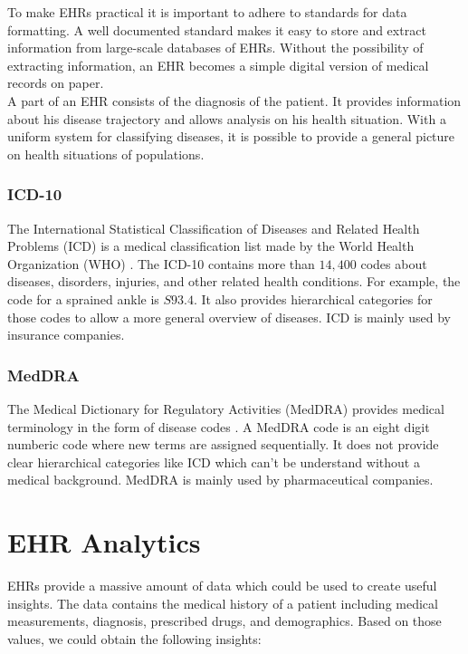 To make EHRs practical it is important to adhere to standards for data formatting. A well documented standard makes it easy to store and extract information from large-scale databases of EHRs. Without the possibility of extracting information, an EHR becomes a simple digital version of medical records on paper. \\
A part of an EHR consists of the diagnosis of the patient. It provides information about his disease trajectory and allows analysis on his health situation. With a uniform system for classifying diseases, it is possible to provide a general picture on health situations of populations.

\subsubsection{ICD-10}

The International Statistical Classification of Diseases and Related Health Problems (ICD) is a medical classification list made by the World Health Organization (WHO) \cite{WHO_ICD:online}. The ICD-10 contains more than $14,400$ codes about diseases, disorders, injuries, and other related health conditions. For example, the code for a sprained ankle is $S93.4$. It also provides hierarchical categories for those codes to allow a more general overview of diseases. ICD is mainly used by insurance companies.


\subsubsection{MedDRA}

The Medical Dictionary for Regulatory Activities (MedDRA) provides medical terminology in the form of disease codes \cite{MedDRA:online}. A MedDRA code is an eight digit numberic code where new terms are assigned sequentially. It does not provide clear hierarchical categories like ICD which can't be understand without a medical background. MedDRA is mainly used by pharmaceutical companies.

\section{EHR Analytics}
\label{sec:ehra}

EHRs provide a massive amount of data which could be used to create useful insights. The data contains the medical history of a patient including medical measurements, diagnosis, prescribed drugs, and demographics. Based on those values, we could obtain the following insights:

